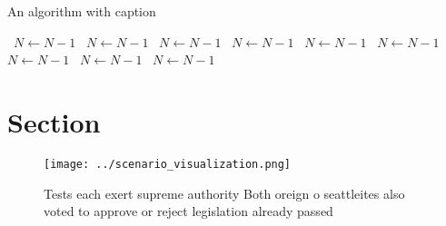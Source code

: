 \documentclass[a4paper]{article}
\begin{document}
\begin{algorithm}
\caption{An algorithm with caption}
\begin{algorithmic}
\    \State $N \gets N - 1$
\    \State $N \gets N - 1$
\    \State $N \gets N - 1$
\    \State $N \gets N - 1$
\    \State $N \gets N - 1$
\    \State $N \gets N - 1$
\    \State $N \gets N - 1$
\    \State $N \gets N - 1$
\    \State $N \gets N - 1$
\EndWhile
\end{algorithmic}
\end{algorithm}

\section{Section}

\begin{figure}
\centering
\texttt{[image: ../scenario\_visualization.png]}
\caption{Tests each exert supreme authority Both oreign o seattleites also voted to approve or reject legislation already passed
}
\end{figure}
 
\end{document}
